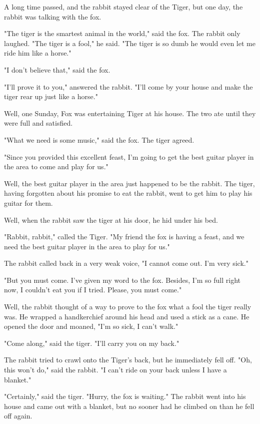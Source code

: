A long time passed, and the rabbit stayed clear of the Tiger, but one day, the rabbit was talking with the fox.

"The tiger is the smartest animal in the world," said the fox. The rabbit only laughed. "The tiger is a fool," he said. "The tiger is so dumb he would even let me ride him like a horse."

"I don't believe that," said the fox.

"I'll prove it to you," answered the rabbit. "I'll come by your house and make the tiger rear up just like a horse."

Well, one Sunday, Fox was entertaining Tiger at his house. The two ate until they were full and satisfied.

"What we need is some music," said the fox. The tiger agreed.

"Since you provided this excellent feast, I'm going to get the best guitar player in the area to come and play for us."

Well, the best guitar player in the area just happened to be the rabbit. The tiger, having forgotten about his promise to eat the rabbit, went to get him to play his guitar for them.

Well, when the rabbit saw the tiger at his door, he hid under his bed.

"Rabbit, rabbit," called the Tiger. "My friend the fox is having a feast, and we need the best guitar player in the area to play for us."

The rabbit called back in a very weak voice, "I cannot come out. I'm very sick."

"But you must come. I've given my word to the fox. Besides, I'm so full right now, I couldn't eat you if I tried. Please, you must come."

Well, the rabbit thought of a way to prove to the fox what a fool the tiger really was. He wrapped a handkerchief around his head and used a stick as a cane. He opened the door and moaned, "I'm so sick, I can't walk."

"Come along," said the tiger. "I'll carry you on my back."

The rabbit tried to crawl onto the Tiger's back, but he immediately fell off. "Oh, this won't do," said the rabbit. "I can't ride on your back unless I have a blanket."

"Certainly," said the tiger. "Hurry, the fox is waiting." The rabbit went into his house and came out with a blanket, but no sooner had he climbed on than he fell off again.


